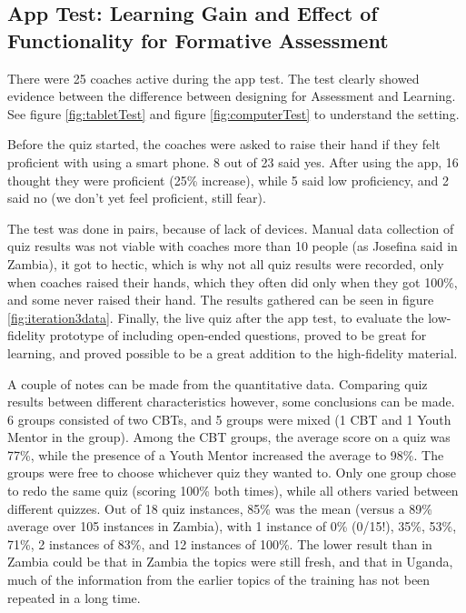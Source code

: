 
    \subsection{App Test: Learning Gain and Effect of Functionality for Formative Assessment}
  There were 25 coaches active during the app test. The test clearly showed evidence between the difference between designing for Assessment and Learning. See figure \ref{fig:tabletTest} and figure \ref{fig:computerTest} to understand the setting.

  Before the quiz started, the coaches were asked to raise their hand if they felt proficient with using a smart phone. 8 out of 23 said yes. After using the app, 16 thought they were proficient (25\% increase), while 5 said low proficiency, and 2 said no (we don't yet feel proficient, still fear).

  The test was done in pairs, because of lack of devices. Manual data collection of quiz results was not viable with coaches more than 10 people (as Josefina said in Zambia), it got to hectic, which is why not all quiz results were recorded, only when coaches raised their hands, which they often did only when they got 100\%, and some never raised their hand. The results gathered can be seen in figure \ref{fig:iteration3data}. Finally, the live quiz after the app test, to evaluate the low-fidelity prototype of including open-ended questions, proved to be great for learning, and proved possible to be a great addition to the high-fidelity material.

  A couple of notes can be made from the quantitative data. Comparing quiz results between different characteristics however, some conclusions can be made. 6 groups consisted of two CBTs, and 5 groups were mixed (1 CBT and 1 Youth Mentor in the group). Among the CBT groups, the average score on a quiz was 77\%, while the presence of a Youth Mentor increased the average to 98\%. The groups were free to choose whichever quiz they wanted to. Only one group chose to redo the same quiz (scoring 100\% both times), while all others varied between different quizzes. Out of 18 quiz instances, 85\% was the mean (versus a 89\% average over 105 instances in Zambia), with 1 instance of 0\% (0/15!), 35\%, 53\%, 71\%, 2 instances of 83\%, and 12 instances of 100\%. The lower result than in Zambia could be that in Zambia the topics were still fresh, and that in Uganda, much of the information from the earlier topics of the training has not been repeated in a long time.


